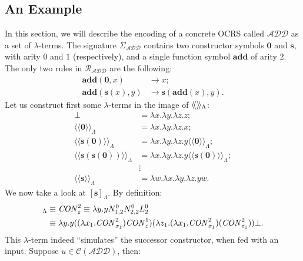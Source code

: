 \documentclass{LMCS}
\newcommand{\varone}{x}
\newcommand{\vartwo}{y}
\newcommand{\varthree}{z}
\newcommand{\varfour}{w}
\newcommand{\lambdatwo}{N}
\newcommand{\lambdathree}{L}
\newcommand{\termtwo}{u}
\newcommand{\TRStolambdaI}[1]{\langle\!\langle #1\rangle\!\rangle_{\Lambdaterms}}
\newcommand{\TRStolambdaII}[1]{[#1]_{\Lambdaterms}}
\newcommand{\errorterm}{\bot}
\newcommand{\Lambdaterms}{\Lambda}
\newcommand{\Functions}[1]{\Sigma_{#1}}
\newcommand{\Rules}[1]{\mathcal{R}_{#1}}
\newcommand{\TRScontermsp}[1]{\mathcal{C}(#1)}
\begin{document}
\subsection{An Example}\label{sect-EsempioTRStoLam}
\newcommand{\TRSadd}{\mathcal{ADD}}
\newcommand{\zero}{\mathbf{0}}
\newcommand{\suc}{\mathbf{s}}
\newcommand{\add}{\mathbf{add}}
In this section, we will describe the encoding of a concrete OCRS called $\TRSadd$ as a set of 
$\lambda$-terms. The signature $\Functions{\TRSadd}$ contains two constructor symbols
$\zero$ and $\suc$, with arity $0$ and $1$ (respectively), and a single function
symbol $\add$ of arity $2$. The only two rules in $\Rules{\TRSadd}$ are the following:
\begin{align*}
\add(\zero,\varone)&\rightarrow\varone;\\
\add(\suc(\varone),\vartwo)&\rightarrow\suc(\add(\varone),\vartwo).
\end{align*}
Let us construct first some $\lambda$-terms in the image of $\TRStolambdaI{\relax}$:
\begin{align*}
\errorterm&=\lambda\varone.\lambda\vartwo.\lambda\varthree.\varthree;\\
\TRStolambdaI{\zero}&=\lambda\varone.\lambda\vartwo.\lambda\varthree.\varone;\\
\TRStolambdaI{\suc(\zero)}&=\lambda\varone.\lambda\vartwo.\lambda\varthree.\vartwo\TRStolambdaI{\zero};\\
\TRStolambdaI{\suc(\suc(\zero))}&=\lambda\varone.\lambda\vartwo.\lambda\varthree.\vartwo\TRStolambdaI{\suc(\zero)};\\
&\vdots\\
\TRStolambdaI{\suc}&=\lambda\varfour.\lambda\varone.\lambda\vartwo.\lambda\varthree.\vartwo\varfour.
\end{align*}
We now take a look at $\TRStolambdaII{\suc}$. By definition:
\begin{align*}
\TRStolambdaII{\suc}&\equiv\conslambda^2_{\varepsilon}\equiv\lambda\vartwo.\vartwo\lambdatwo_{1,2}^0\lambdatwo_{2,2}^0\lambdathree^0_2\\
   &\equiv\lambda\vartwo.\vartwo((\lambda\varone_1.\conslambda^2_{\varone_1})\conslambda^1_{\varepsilon})
                                (\lambda\varthree_1.(\lambda\varone_1.\conslambda^2_{\varone_1})(\conslambda^2_{\varthree_1}))\errorterm.
\end{align*}
This $\lambda$-term indeed ``simulates'' the successor constructor, when fed with an input. Suppose $\termtwo\in\TRScontermsp{\TRSadd}$, then:
\end{document}

